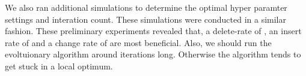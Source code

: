 \documentclass[./../../paper.tex]{subfiles}
\begin{document}
We also ran additional simulations to determine the optimal hyper paramter settings and interation count. These simulations were conducted in a similar fashion. These preliminary experiments revealed that, a delete-rate of , an insert rate of  and a change rate of  are most beneficial. Also, we should run the evoltuionary algorithm around  iterations long. Otherwise the algorithm tends to get stuck in a local optimum.
\end{document}
